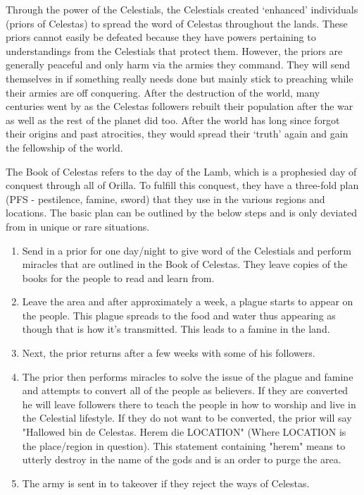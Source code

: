 Through the power of the Celestials, the Celestials created `enhanced' individuals (priors of Celestas) to spread the word of Celestas throughout the lands. These priors cannot easily be defeated because they have powers pertaining to understandings from the Celestials that protect them. However, the priors are generally peaceful and only harm via the armies they command. They will send themselves in if something really needs done but mainly stick to preaching while their armies are off conquering. After the destruction of the world, many centuries went by as the Celestas followers rebuilt their population after the war as well as the rest of the planet did too. After the world has long since forgot their origins and past atrocities, they would spread their `truth' again and gain the fellowship of the world.

The Book of Celestas refers to the day of the Lamb, which is a prophesied day of conquest through all of Orilla. To fulfill this conquest, they have a three-fold plan (PFS - pestilence, famine, sword) that they use in the various regions and locations. The basic plan can be outlined by the below steps and is only deviated from in unique or rare situations.

\begin{enumerate}
	\item Send in a prior for one day/night to give word of the Celestials and perform miracles that are outlined in the Book of Celestas. They leave copies of the books for the people to read and learn from.
	\item Leave the area and after approximately a week, a plague starts to appear on the people. This plague spreads to the food and water thus appearing as though that is how it's transmitted. This leads to a famine in the land.
	\item Next, the prior returns after a few weeks with some of his followers.
	\item The prior then performs miracles to solve the issue of the plague and famine and attempts to convert all of the people as believers. If they are converted he will leave followers there to teach the people in how to worship and live in the Celestial lifestyle. If they do not want to be converted, the prior will say "Hallowed bin de Celestas. Herem die LOCATION" (Where LOCATION is the place/region in question). This statement containing "herem" means to utterly destroy in the name of the gods and is an order to purge the area.
	\item The army is sent in to takeover if they reject the ways of Celestas.
\end{enumerate}


